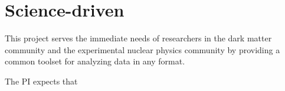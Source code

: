 



\section{Science-driven}

This project serves the immediate needs of researchers in the dark matter community and the experimental nuclear physics community by providing a common toolset for analyzing data in any format.

The PI expects that

